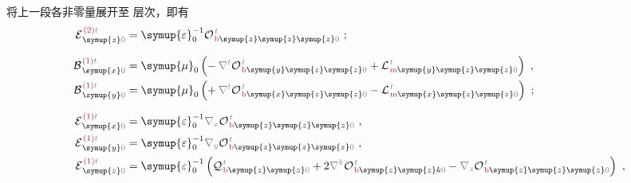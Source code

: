 将上一段各非零量展开至  层次，即有
\begin{subequations} \label{eq:EB^(2-1)_0}
\begin{align}
	{\mathcal{E}}^{\;\!\textcolor{Maroon}{(2)}\mathcolor{gray}{t}}_{\;\! \symup{z} \mathcolor{gray}{0}} &= {\symup{\varepsilon}}_0^{-1} {\mathcal{O}}^{\;\!\mathcolor{gray}{t}}_{\;\!\textcolor{Maroon}{\text{b}}\symup{z} \symup{z} \symup{z} \mathcolor{gray}{0}}~; \label{eq:E^(2)_z0} \\[0.7em]
	{\mathcal{B}}^{\;\!\textcolor{Maroon}{(1)}\mathcolor{gray}{t}}_{\;\! \symup{x} \mathcolor{gray}{0}} &= {\symup{\mu}}_0 \left( -\hspace{0.2em} \mathcolor{gray}{\nabla^t}
	{\mathcal{O}}^{\;\!\mathcolor{gray}{t}}_{\;\!\textcolor{Maroon}{\text{b}}\symup{y}\symup{z}\symup{z}\mathcolor{gray}{0}} + {\mathcal{L}}^{\;\!\mathcolor{gray}{t}}_{\;\!\textcolor{Maroon}{\text{m}}\symup{y}\symup{z}\symup{z}\mathcolor{gray}{0}} \right)~, \label{eq:B^(1)_x0} \\
	{\mathcal{B}}^{\;\!\textcolor{Maroon}{(1)}\mathcolor{gray}{t}}_{\;\! \symup{y} \mathcolor{gray}{0}} &= {\symup{\mu}}_0 \left( +\hspace{0.2em} \mathcolor{gray}{\nabla^t}
	{\mathcal{O}}^{\;\!\mathcolor{gray}{t}}_{\;\!\textcolor{Maroon}{\text{b}}\symup{x}\symup{z}\symup{z}\mathcolor{gray}{0}} - {\mathcal{L}}^{\;\!\mathcolor{gray}{t}}_{\;\!\textcolor{Maroon}{\text{m}}\symup{x}\symup{z}\symup{z}\mathcolor{gray}{0}} \right)~; \label{eq:B^(1)_y0} \\[0.7em]
	{\mathcal{E}}^{\;\!\textcolor{Maroon}{(1)}\mathcolor{gray}{t}}_{\;\! \symup{x} \mathcolor{gray}{0}} &= {\symup{\varepsilon}}_0^{-1} \mathcolor{gray}{\nabla_x} {\mathcal{O}}^{\;\!\mathcolor{gray}{t}}_{\;\!\textcolor{Maroon}{\text{b}}\symup{z} \symup{z} \symup{z} \mathcolor{gray}{0}}~, \label{eq:E^(1)_x0} \\
	{\mathcal{E}}^{\;\!\textcolor{Maroon}{(1)}\mathcolor{gray}{t}}_{\;\! \symup{y} \mathcolor{gray}{0}} &= {\symup{\varepsilon}}_0^{-1} \mathcolor{gray}{\nabla_y} {\mathcal{O}}^{\;\!\mathcolor{gray}{t}}_{\;\!\textcolor{Maroon}{\text{b}}\symup{z} \symup{z} \symup{z} \mathcolor{gray}{0}}~, \label{eq:E^(1)_y0} \\
	{\mathcal{E}}^{\;\!\textcolor{Maroon}{(1)}\mathcolor{gray}{t}}_{\;\! \symup{z} \mathcolor{gray}{0}} &= {\symup{\varepsilon}}_0^{-1} \left( {\mathcal{Q}}^{\;\!\mathcolor{gray}{t}}_{\;\!\textcolor{Maroon}{\text{b}}\symup{z} \symup{z} \mathcolor{gray}{0}} + 2 \mathcolor{gray}{\nabla^k} {\mathcal{O}}^{\;\!\mathcolor{gray}{t}}_{\;\!\textcolor{Maroon}{\text{b}}\symup{z} \symup{z} k \mathcolor{gray}{0}} - \mathcolor{gray}{\nabla_z} {\mathcal{O}}^{\;\!\mathcolor{gray}{t}}_{\;\!\textcolor{Maroon}{\text{b}}\symup{z} \symup{z} \symup{z} \mathcolor{gray}{0}} \right)~, \label{eq:E^(1)_z0}
\end{align}
\end{subequations}

